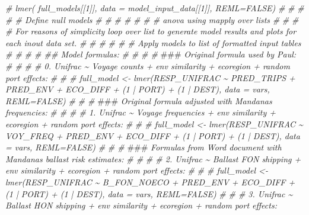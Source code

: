 \documentclass[
]{article}
\newenvironment{Shaded}{\begin{snugshade}}{\end{snugshade}}
\newcommand{\AlertTok}[1]{\textcolor[rgb]{0.94,0.16,0.16}{#1}}
\newcommand{\CommentTok}[1]{\textcolor[rgb]{0.56,0.35,0.01}{\textit{#1}}}
\begin{document}
\begin{Shaded}
\begin{Highlighting}[]
\CommentTok{\# lmer( full\_models[[1]], data = model\_input\_data[[1]], REML=FALSE)}
\CommentTok{\# }
\CommentTok{\# }
\CommentTok{\# \#\textquotesingle{} \# Define null models}
\CommentTok{\# }
\CommentTok{\# }
\CommentTok{\# \# }
\CommentTok{\# }
\CommentTok{\# \# anova using mapply over lists}
\CommentTok{\# }
\CommentTok{\# }
\CommentTok{\# \#\textquotesingle{} For reasons of simplicity loop over list to generate model results and plots for each inout data set.}
\CommentTok{\# }
\CommentTok{\# \#\textquotesingle{}}
\CommentTok{\# \#\textquotesingle{} \# Apply models to list of formatted input tables }
\CommentTok{\# \#\textquotesingle{} }
\CommentTok{\# \#\textquotesingle{} \#\# Model formulas: }
\CommentTok{\# \#\textquotesingle{}}
\CommentTok{\# \#\textquotesingle{} }\AlertTok{\#\#\#}\CommentTok{ Original formula used by Paul:}
\CommentTok{\# \#\textquotesingle{} }
\CommentTok{\# \#\textquotesingle{} 0. \textasciigrave{} Unifrac \textasciitilde{} Voyage counts  + env similarity + ecoregion + random port effects\textasciigrave{}:}
\CommentTok{\# }
\CommentTok{\# \# full\_model <{-} lmer(RESP\_UNIFRAC \textasciitilde{} PRED\_TRIPS + PRED\_ENV + ECO\_DIFF + (1 | PORT) + (1 | DEST), data = vars, REML=FALSE)}
\CommentTok{\# }
\CommentTok{\# \#\textquotesingle{} }\AlertTok{\#\#\#}\CommentTok{ Original formula adjusted with Mandana\textquotesingle{}s frequencies:}
\CommentTok{\# \#\textquotesingle{}}
\CommentTok{\# \#\textquotesingle{} 1. \textasciigrave{}Unifrac \textasciitilde{} Voyage frequencies + env similarity + ecoregion + random port effects\textasciigrave{}:}
\CommentTok{\# }
\CommentTok{\# \# full\_model <{-} lmer(RESP\_UNIFRAC \textasciitilde{} VOY\_FREQ + PRED\_ENV + ECO\_DIFF + (1 | PORT) + (1 | DEST), data = vars, REML=FALSE)}
\CommentTok{\# }
\CommentTok{\# \#\textquotesingle{} }\AlertTok{\#\#\#}\CommentTok{ Formulas from Word document with Mandana\textquotesingle{}s ballast risk estimates:}
\CommentTok{\# \#\textquotesingle{} }
\CommentTok{\# \#\textquotesingle{} 2.  \textasciigrave{}Unifrac \textasciitilde{} Ballast FON shipping + env similarity + ecoregion + random port effects\textasciigrave{}:}
\CommentTok{\# }
\CommentTok{\# \# full\_model <{-} lmer(RESP\_UNIFRAC \textasciitilde{} B\_FON\_NOECO + PRED\_ENV + ECO\_DIFF + (1 | PORT) + (1 | DEST), data = vars, REML=FALSE)}
\CommentTok{\# }
\CommentTok{\# \#\textquotesingle{} 3.  \textasciigrave{}Unifrac \textasciitilde{} Ballast HON shipping + env similarity + ecoregion + random port effects\textasciigrave{}:}

\end{Highlighting}
\end{Shaded}
\end{document}
